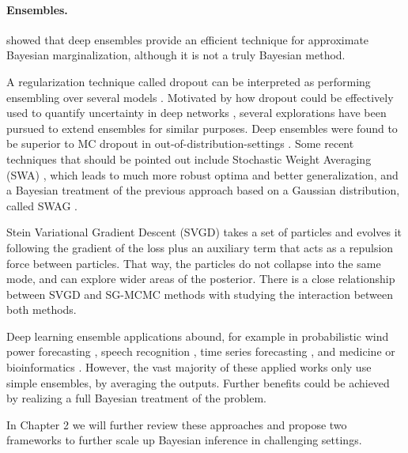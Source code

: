 \fi
\paragraph{Ensembles.} \cite{bdl} showed that deep ensembles \cite{ensemble} provide an efficient technique for approximate Bayesian marginalization, although it is not a truly Bayesian method.

A regularization technique called dropout can be interpreted as performing ensembling over several models \cite{dropout}. Motivated by how dropout could be effectively used to quantify uncertainty in deep networks \cite{pmlr-v48-gal16}, several explorations have been pursued to extend ensembles for similar purposes. Deep ensembles were found to be superior to MC dropout in out-of-distribution-settings \cite{Ovadia2019CanYT}.
Some recent techniques that should be pointed out include
Stochastic Weight Averaging (SWA) \cite{izmailov2018averaging}, which leads to much more robust optima and better generalization, and a Bayesian treatment of the previous approach based on a Gaussian distribution,
called SWAG \cite{NEURIPS2019_118921ef}.

Stein Variational Gradient Descent (SVGD) \cite{svgd} takes a set of particles and evolves it following the gradient of the loss plus an auxiliary term that acts as a repulsion force between particles. That
way, the particles do not collapse into the same mode, and can explore wider areas of the posterior. There is a close relationship between SVGD and SG-MCMC methods with \cite{gallego2018stochastic} 
studying the interaction between both methods.

Deep learning ensemble applications abound, for example in probabilistic wind power forecasting \cite{wang2017deep}, speech recognition \cite{deng2014ensemble}, time series forecasting \cite{qiu2014ensemble}, and medicine or bioinformatics \cite{qummar2019deep,xiao2018deep,cao2020ensemble}. However, the vast majority of these applied works only use simple ensembles, by averaging the outputs. Further benefits could be achieved by realizing a full Bayesian treatment of the problem.

In Chapter 2 we will further review these approaches and propose two frameworks to further scale up Bayesian inference in challenging settings.


